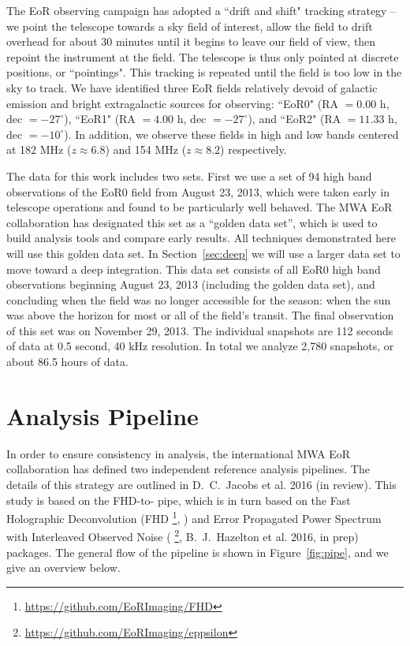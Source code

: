 \documentclass[iop]{emulateapj}
\begin{document}
The EoR observing campaign has adopted a ``drift and shift" tracking strategy -- we point 
the telescope towards a sky field of interest, allow the field to drift overhead for about 30 
minutes until it begins to leave our field of view, then repoint the instrument at the field. The 
telescope is thus only pointed at discrete positions, or ``pointings". This tracking is 
repeated until the field is too low in the sky to track. We have identified three EoR fields 
relatively devoid of galactic emission and bright extragalactic sources for observing: 
``EoR0" (RA $=0.00$ h, dec $= -27^\circ$), ``EoR1" (RA $=4.00$ h, dec $= -27^\circ$), 
and ``EoR2" (RA $=11.33$ h, dec $= -10^\circ$). In addition, we observe these fields in 
high and low bands centered at 182 MHz ($z\approx6.8$) and 154 MHz ($z\approx8.2$) 
respectively.

The data for this work includes two sets. First we use a set of 94 high band observations of 
the EoR0 field from August 23, 2013, which were taken early in telescope operations and 
found to be particularly well behaved. The MWA EoR collaboration has designated this set 
as a ``golden data set'', which is used to build analysis tools and compare early results. All 
techniques demonstrated here will use this golden data set. In Section~\ref{sec:deep} we 
will use a larger data set to move toward a deep integration. This data set consists of all 
EoR0 high band observations beginning August 23, 2013 (including the golden data set), 
and concluding when the field was no longer accessible for the season: when the sun was 
above the horizon for most or all of the field's transit. The final observation of this set was 
on November 29, 2013. The individual snapshots are 112 seconds of data at 0.5 second, 
40 kHz resolution. In total we analyze 2,780 snapshots, or about 86.5 hours of data.

\section{Analysis Pipeline}\label{sec:analysis}
In order to ensure consistency in analysis, the international MWA EoR collaboration has 
defined two independent reference analysis pipelines. The details of this strategy are 
outlined in D.~C.~Jacobs et al. 2016 (in review). This study is based on the FHD-to-
\eppsilon pipe, which is in turn based on the Fast Holographic Deconvolution (FHD
\footnote{\url{https://github.com/EoRImaging/FHD}}, \citealt{Sullivan:2012}) and Error 
Propagated Power Spectrum with Interleaved Observed Noise (\eppsilon
\footnote{\url{https://github.com/EoRImaging/eppsilon}}, B.~J.~Hazelton et al. 2016, in 
prep) packages. The general flow of the pipeline is shown in Figure~\ref{fig:pipe}, and we 
give an overview below.
\end{document}
